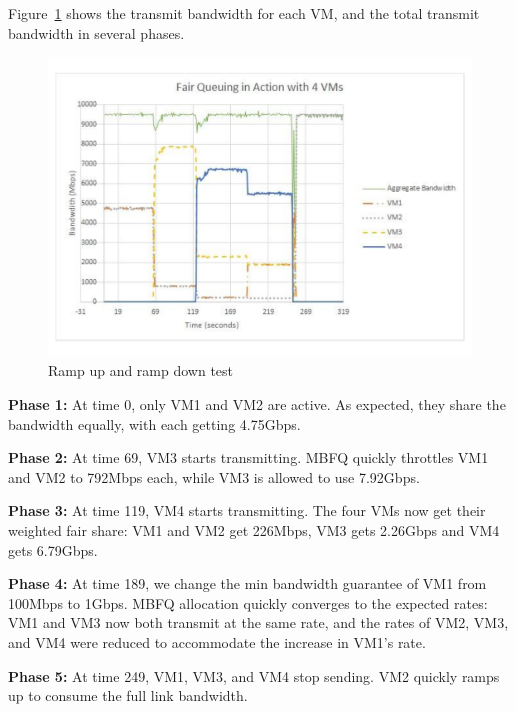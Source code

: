 Figure~\ref{fairsharing}  shows the transmit bandwidth for each VM, and the
total transmit bandwidth in several phases. 

\begin{figure}[h]
\centering
\includegraphics[width=0.8\columnwidth,trim=60pt 20mm 0pt 8mm]{figures/fairsharing}
\caption{Ramp up and ramp down test}
\label{fairsharing}
\vspace{-3mm}
\end{figure}

{\bf Phase 1:}  At time 0, only VM1 and VM2 are active. As expected, they share
the bandwidth equally, with each getting 4.75Gbps.

{\bf Phase 2:} At time 69, VM3 starts transmitting. MBFQ quickly
throttles VM1 and VM2 to 792Mbps each, while VM3 is allowed to use 7.92Gbps. 

{\bf  Phase 3:} At time 119, VM4 starts transmitting. The four VMs now
get their weighted fair share: VM1 and VM2 get 226Mbps, VM3
gets 2.26Gbps and VM4 gets 6.79Gbps. 

{\bf  Phase 4:} At time 189, we change the min bandwidth guarantee of VM1 from 100Mbps to
1Gbps. MBFQ allocation quickly converges to the expected rates: VM1 and VM3
now both transmit at the same rate, and the rates of VM2, VM3, and VM4 were reduced
to accommodate the increase in VM1's rate.

{\bf Phase 5:} At time 249, VM1, VM3, and VM4 stop sending. VM2 quickly
ramps up to consume the full link bandwidth.

